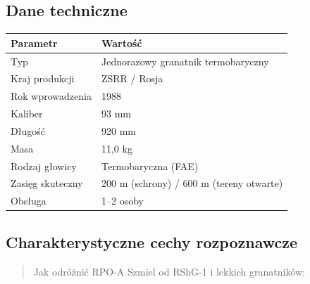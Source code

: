 \documentclass[12pt,oneside]{book}
\begin{document}
\subsection{Dane techniczne}\label{dane-techniczne-92}

\begin{longtable}[]{@{}ll@{}}
\toprule\noalign{}
Parametr & Wartość \\
\midrule\noalign{}
\endhead
\bottomrule\noalign{}
\endlastfoot
Typ & Jednorazowy granatnik termobaryczny \\
Kraj produkcji & ZSRR / Rosja \\
Rok wprowadzenia & 1988 \\
Kaliber & 93 mm \\
Długość & 920 mm \\
Masa & 11,0 kg \\
Rodzaj głowicy & Termobaryczna (FAE) \\
Zasięg skuteczny & 200 m (schrony) / 600 m (tereny otwarte) \\
Obsługa & 1--2 osoby \\
\end{longtable}

\subsection{Charakterystyczne cechy
rozpoznawcze}\label{charakterystyczne-cechy-rozpoznawcze-92}

\begin{quote}
Jak odróżnić RPO-A Szmiel od RShG-1 i lekkich granatników:
\end{quote}
\end{document}
